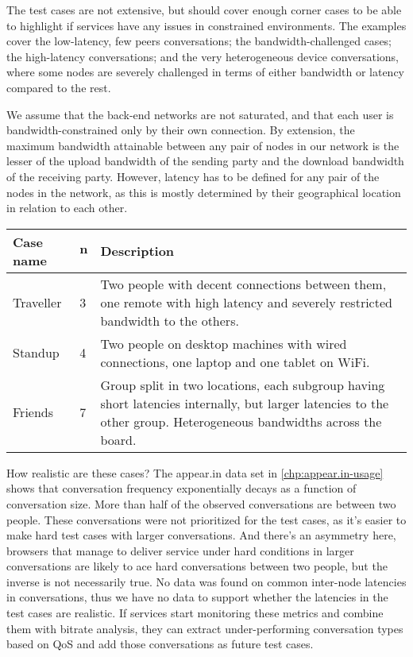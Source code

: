 The test cases are not extensive, but should cover enough corner cases to be able to highlight if services have any issues in constrained environments. The examples cover the low-latency, few peers conversations; the bandwidth-challenged cases; the high-latency conversations; and the very heterogeneous device conversations, where some nodes are severely challenged in terms of either bandwidth or latency compared to the rest.

We assume that the back-end networks are not saturated, and that each user is bandwidth-constrained only by their own connection. By extension, the maximum bandwidth attainable between any pair of nodes in our network is the lesser of the upload bandwidth of the sending party and the download bandwidth of the receiving party. However, latency has to be defined for any pair of the nodes in the network, as this is mostly determined by their geographical location in relation to each other.

\begin{center}
    \label{tab:test-cases}
    \begin{tabular}{| l | l | p{7cm} |}
    \hline
    \textbf{Case name} & $\textbf{n}$ & \textbf{Description} \\ \hline
    Traveller & 3 & Two people with decent connections between them, one remote with high latency and severely restricted bandwidth to the others. \\ \hline
    Standup & 4 & Two people on desktop machines with wired connections, one laptop and one tablet on WiFi. \\ \hline
    Friends & 7 & Group split in two locations, each subgroup having short latencies internally, but larger latencies to the other group. Heterogeneous bandwidths across the board. \\ \hline
    \end{tabular}
\end{center}

How realistic are these cases? The appear.in data set in \autoref{chp:appear.in-usage} shows that conversation frequency exponentially decays as a function of conversation size. More than half of the observed conversations are between two people. These conversations were not prioritized for the test cases, as it's easier to make hard test cases with larger conversations. And there's an asymmetry here, browsers that manage to deliver service under hard conditions in larger conversations are likely to ace hard conversations between two people, but the inverse is not necessarily true. No data was found on common inter-node latencies in conversations, thus we have no data to support whether the latencies in the test cases are realistic. If services start monitoring these metrics and combine them with bitrate analysis, they can extract under-performing conversation types based on QoS and add those conversations as future test cases.


